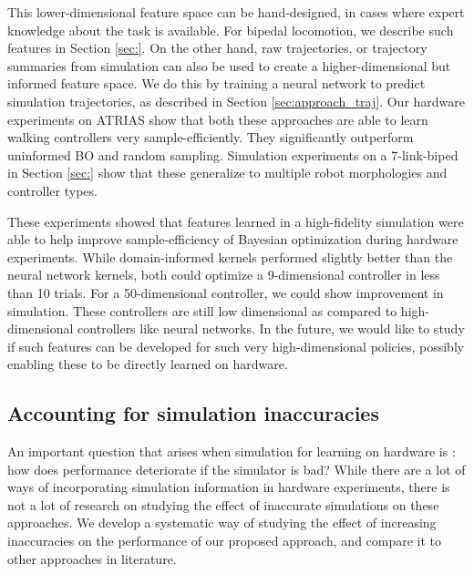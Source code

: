 This lower-dimensional feature space can be hand-designed, in cases where expert knowledge about the task is available. For bipedal locomotion, we describe such features in Section \ref{sec:}. On the other hand, raw trajectories, or trajectory summaries from simulation can also be used to create a higher-dimensional but informed feature space. We do this by training a neural network to predict simulation trajectories, as described in Section \ref{sec:approach_traj}. Our hardware experiments on ATRIAS show that both these approaches are able to learn walking controllers very sample-efficiently. They significantly outperform uninformed BO and random sampling. Simulation experiments on a 7-link-biped in Section \ref{sec:} show that these generalize to multiple robot morphologies and controller types.

These experiments showed that features learned in a high-fidelity simulation were able to help improve sample-efficiency of Bayesian optimization during hardware experiments. While domain-informed kernels performed slightly better than the neural network kernels, both could optimize a 9-dimensional controller in less than 10 trials. For a 50-dimensional controller, we could show improvement in simulation. These controllers are still low dimensional as compared to high-dimensional controllers like neural networks. 
In the future, we would like to study if such features can be developed for such very high-dimensional policies, possibly enabling these to be directly learned on hardware. 

\subsection{Accounting for simulation inaccuracies}

An important question that arises when simulation for learning on hardware is : how does performance deteriorate if the simulator is bad? While there are a lot of ways of incorporating simulation information in hardware experiments, there is not a lot of research on studying the effect of inaccurate simulations on these approaches. We develop a systematic way of studying the effect of increasing inaccuracies on the performance of our proposed approach, and compare it to other approaches in literature.

